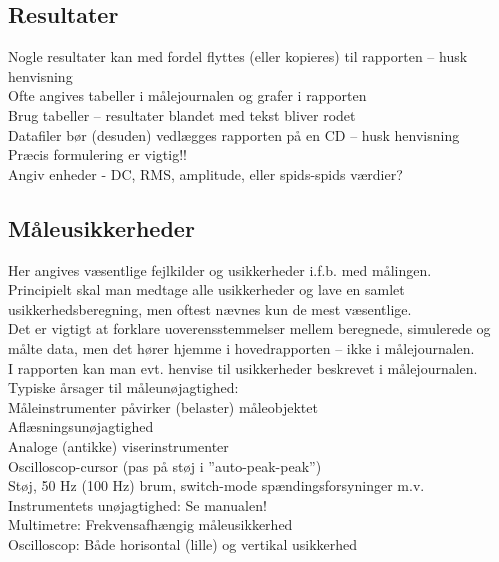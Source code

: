 \subsection*{Resultater}
\label{mic_output_resultater}
Nogle resultater kan med fordel flyttes (eller kopieres) til rapporten – husk henvisning \\
Ofte angives tabeller i målejournalen og grafer i rapporten \\
Brug tabeller – resultater blandet med tekst bliver rodet\\
Datafiler bør (desuden) vedlægges rapporten på en CD – husk henvisning\\
Præcis formulering er vigtig!!\\
Angiv enheder - DC, RMS, amplitude, eller spids-spids værdier?\\

\subsection*{Måleusikkerheder}
\label{mic_output_maaleusikkerheder}
Her angives væsentlige fejlkilder og usikkerheder i.f.b. med målingen. \\
Principielt skal man medtage alle usikkerheder og lave en samlet usikkerhedsberegning, men oftest nævnes kun de mest væsentlige. \\
Det er vigtigt at forklare uoverensstemmelser mellem beregnede, simulerede og målte data, men det hører hjemme i hovedrapporten – ikke i målejournalen. \\
I rapporten kan man evt. henvise til usikkerheder beskrevet i målejournalen.\\
Typiske årsager til måleunøjagtighed:\\
Måleinstrumenter påvirker (belaster) måleobjektet\\
Aflæsningsunøjagtighed\\
Analoge (antikke) viserinstrumenter	\\
Oscilloscop-cursor (pas på støj i ”auto-peak-peak”)\\
Støj, 50 Hz (100 Hz) brum, switch-mode spændingsforsyninger m.v.\\
Instrumentets unøjagtighed: Se manualen! \\
Multimetre: Frekvensafhængig måleusikkerhed \\
Oscilloscop: Både horisontal (lille) og vertikal usikkerhed\\